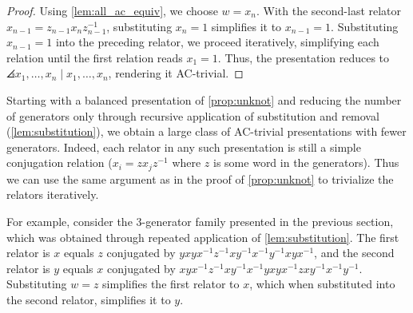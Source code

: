 {\begin{proof}
Using \autoref{lem:all_ac_equiv}, we choose $w = x_n$. 
With the second-last relator \( x_{n-1} = z_{n-1} x_n z_{n-1}^{-1} \), substituting \( x_n = 1 \) simplifies it to \( x_{n-1} = 1 \). Substituting \( x_{n-1} = 1 \) into the preceding relator, we proceed iteratively, simplifying each relation until the first relation reads \( x_1 = 1 \). 
Thus, the presentation reduces to  $\angles{x_1, \ldots, x_n \mid x_1, \ldots, x_n}$,
rendering it AC-trivial. 
\end{proof}
\begin{remark}
    Starting with a balanced presentation of \autoref{prop:unknot} and reducing the number of generators only through recursive application of substitution and removal (\autoref{lem:substitution}), we obtain a large class of AC-trivial presentations with fewer generators. Indeed, each relator in any such presentation is still a simple conjugation relation ($x_i=zx_jz^{-1}$ where $z$ is some word in the generators). Thus we can use the same argument as in the proof of \autoref{prop:unknot} to trivialize the relators iteratively. 
\end{remark}

For example, consider the 3-generator family presented in the previous section, which was obtained through repeated application of \autoref{lem:substitution}. The first relator is $x$ equals $z$ conjugated by  $yxyx^{-1}z^{-1}xy^{-1}x^{-1}y^{-1}xyx^{-1}$, and the second relator is $y$ equals $x$ conjugated by $xyx^{-1}z^{-1}xy^{-1}x^{-1}yxyx^{-1}zxy^{-1}x^{-1}y^{-1}$. Substituting $w=z$ simplifies the first relator to $x$, which when substituted into the second relator, simplifies it to $y$. 

}
